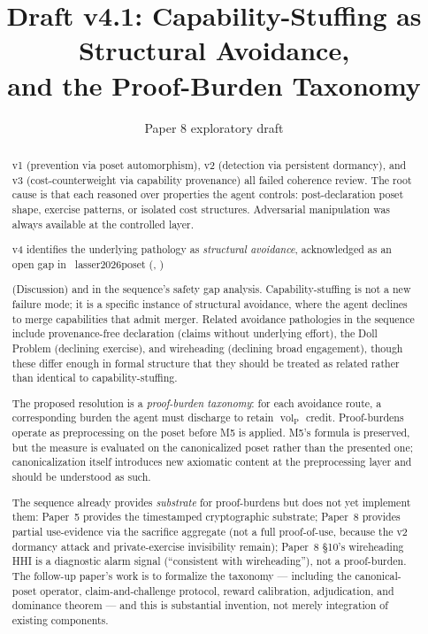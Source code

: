 \documentclass{article}
\title{Draft v4.1: Capability-Stuffing as Structural Avoidance,\\
  and the Proof-Burden Taxonomy}
\author{Paper 8 exploratory draft}
\date{}
\makeatletter
\newcommand{\citep}[2][]{%
  \begingroup
  \def\@tmpkey{#2}%
  \ifx\@tmpkey\@empty\else
    (\ifx\@empty#1\@empty\else #1, \fi
     \@nameuse{bibkey@\@tmpkey})%
  \fi
  \endgroup
}
\DeclareMathOperator{\vol}{vol}
\newcommand{\volL}{{\vol_{\mathrm{P}}}}
\makeatother
\begin{document}
\maketitle

\begin{abstract}
v1 (prevention via poset automorphism), v2 (detection via
persistent dormancy), and v3 (cost-counterweight via capability
provenance) all failed coherence review.  The root cause is that
each reasoned over properties the agent controls: post-declaration
poset shape, exercise patterns, or isolated cost structures.
Adversarial manipulation was always available at the controlled
layer.

v4 identifies the underlying pathology as \emph{structural
avoidance}, acknowledged as an open gap in~\citep{lasser2026poset}
(Discussion) and in the sequence's safety gap analysis.
Capability-stuffing is not a new failure mode; it is a specific
instance of structural avoidance, where the agent declines to
merge capabilities that admit merger.  Related avoidance
pathologies in the sequence include provenance-free declaration
(claims without underlying effort), the Doll Problem (declining
exercise), and wireheading (declining broad engagement), though
these differ enough in formal structure that they should be
treated as related rather than identical to capability-stuffing.

The proposed resolution is a \emph{proof-burden taxonomy}: for
each avoidance route, a corresponding burden the agent must
discharge to retain $\volL$ credit.  Proof-burdens operate as
preprocessing on the poset before M5 is applied.  M5's formula
is preserved, but the measure is evaluated on the canonicalized
poset rather than the presented one; canonicalization itself
introduces new axiomatic content at the preprocessing layer and
should be understood as such.

The sequence already provides \emph{substrate} for proof-burdens
but does not yet implement them: Paper~5 provides the timestamped
cryptographic substrate; Paper~8 provides partial use-evidence
via the sacrifice aggregate (not a full proof-of-use, because the
v2 dormancy attack and private-exercise invisibility remain);
Paper~8 \S10's wireheading HHI is a diagnostic alarm signal
(``consistent with wireheading''), not a proof-burden.  The
follow-up paper's work is to formalize the taxonomy --- including
the canonical-poset operator, claim-and-challenge protocol,
reward calibration, adjudication, and dominance theorem --- and
this is substantial invention, not merely integration of
existing components.


\end{abstract}
\end{document}
